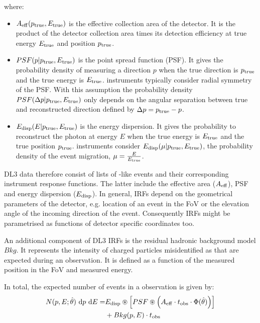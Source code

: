 \documentclass[longauth]{aa}
\begin{document}
where:
\begin{itemize}
\setlength\itemsep{1em}
\item $A_{\rm eff}(p_{\rm true}, E_{\rm true})$ is the effective collection area of the detector. It is the product
  of the detector collection area times its detection efficiency at true energy $E_{\rm true}$ and position $p_{\rm true}$.
\item $PSF(p|p_{\rm true}, E_{\rm true})$ is the point spread function (PSF). It gives the probability density of
  measuring a direction $p$ when the true direction is $p_{\rm true}$ and the true energy is $E_{\rm true}$.
  \gammaray instruments typically consider radial symmetry of the PSF. With this assumption the probability density 
  $PSF(\Delta p|p_{\rm true}, E_{\rm true})$ only depends on the angular separation between true
 and reconstructed direction defined by $\Delta p = p_{\rm true} - p$.  
\item $E_{\rm disp}(E|p_{\rm true}, E_{\rm true})$ is the energy dispersion. It gives the probability to
  reconstruct the photon at energy $E$ when the true energy is $E_{\rm true}$ and the true position $p_{\rm true}$.
  \gammaray instruments consider $E_{\rm disp}(\mu|p_{\rm true}, E_{\rm true})$, the probability density of the event
  migration, $\mu=\frac{E}{E_{\rm true}}$.
\end{itemize}

DL3 \gammaray data therefore consist of lists of \gammaray-like events and their
corresponding instrument response functions. The latter include the effective area ($A_{\rm eff}$),
PSF and energy dispersion ($E_{\rm disp}$).
In general, IRFs depend on the geometrical parameters of the detector, e.g. location 
of an event in the FoV or the elevation angle of the incoming direction of the event.
Consequently IRFs might be parametrised as functions of detector specific coordinates too.


An additional component of DL3 IRFs is the residual hadronic background model $Bkg$.
It represents the intensity of charged particles misidentified as \gammarays that are expected
during an observation. It is defined as a function of the measured position in the FoV
and measured energy.

In total, the expected number of events in a \gammaray observation is given by:
\begin{equation}
	\begin{split}
  N(p, E; \hat{\theta})\ {\rm d}p\ {\rm d}E =  &E_{\rm disp} \circledast \left[ PSF \circledast \left( A_{\rm eff} \cdot t_{\rm obs} \cdot \Phi(\hat{\theta}) \right) \right]\\
                       & + Bkg(p, E) \cdot t_{\rm obs}
	\end{split}
\end{equation}
				
\end{document}
